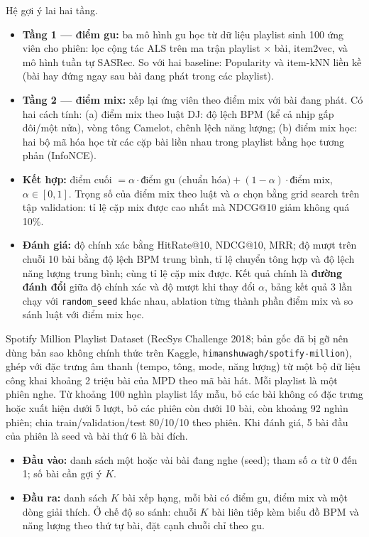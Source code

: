 \documentclass[11pt,a4paper]{article}
\newcommand{\muc}[1]{\par\vspace{0.5em}{\large\bfseries #1}\par\vspace{0.15em}}
\begin{document}
\muc{2. Phương pháp dự kiến}
Hệ gợi ý lai hai tầng.
\begin{itemize}
  \item \textbf{Tầng 1 — điểm gu:} ba mô hình gu học từ dữ liệu playlist sinh 100 ứng viên cho phiên: lọc cộng tác ALS
        trên ma trận playlist × bài, item2vec, và mô hình tuần tự SASRec. So với hai baseline: Popularity và
        item-kNN liền kề (bài hay đứng ngay sau bài đang phát trong các playlist).
  \item \textbf{Tầng 2 — điểm mix:} xếp lại ứng viên theo điểm mix với bài đang phát. Có hai cách tính:
        (a) điểm mix theo luật DJ: độ lệch BPM (kể cả nhịp gấp đôi/một nửa), vòng tông Camelot, chênh lệch năng lượng;
        (b) điểm mix học: hai bộ mã hóa học từ các cặp bài liền nhau trong playlist bằng học tương phản (InfoNCE).
  \item \textbf{Kết hợp:} điểm cuối $= \alpha \cdot \text{điểm gu (chuẩn hóa)} + (1-\alpha) \cdot \text{điểm mix}$,
        $\alpha \in [0, 1]$. Trọng số của điểm mix theo luật và $\alpha$ chọn bằng grid search trên tập validation:
        tỉ lệ cặp mix được cao nhất mà NDCG@10 giảm không quá 10\%.
  \item \textbf{Đánh giá:} độ chính xác bằng HitRate@10, NDCG@10, MRR; độ mượt trên chuỗi 10 bài bằng độ lệch BPM
        trung bình, tỉ lệ chuyển tông hợp và độ lệch năng lượng trung bình; cùng tỉ lệ cặp mix được. Kết quả chính là
        \textbf{đường đánh đổi} giữa độ chính xác và độ mượt khi thay đổi $\alpha$, bảng kết quả 3 lần chạy với
        \texttt{random\_seed} khác nhau, ablation từng thành phần điểm mix và so sánh luật với điểm mix học.
\end{itemize}

\muc{3. Dữ liệu}
Spotify Million Playlist Dataset (RecSys Challenge 2018; bản gốc đã bị gỡ nên dùng bản sao không chính thức trên Kaggle,
\texttt{himanshuwagh/spotify-million}), ghép với
đặc trưng âm thanh (tempo, tông, mode, năng lượng) từ một bộ dữ liệu công khai khoảng 2 triệu bài của MPD theo mã bài hát.
Mỗi playlist là một phiên nghe. Từ khoảng 100 nghìn playlist lấy mẫu, bỏ các bài không có đặc trưng hoặc xuất hiện dưới
5 lượt, bỏ các phiên còn dưới 10 bài, còn khoảng 92 nghìn phiên; chia train/validation/test 80/10/10 theo phiên. Khi đánh giá,
5 bài đầu của phiên là seed và bài thứ 6 là bài đích.

\muc{4. Đầu vào và đầu ra}
\begin{itemize}
  \item \textbf{Đầu vào:} danh sách một hoặc vài bài đang nghe (seed); tham số $\alpha$ từ 0 đến 1; số bài cần gợi ý $K$.
  \item \textbf{Đầu ra:} danh sách $K$ bài xếp hạng, mỗi bài có điểm gu, điểm mix và một dòng giải thích. Ở chế độ so sánh:
        chuỗi $K$ bài liên tiếp kèm biểu đồ BPM và năng lượng theo thứ tự bài, đặt cạnh chuỗi chỉ theo gu.
\end{itemize}
\end{document}
